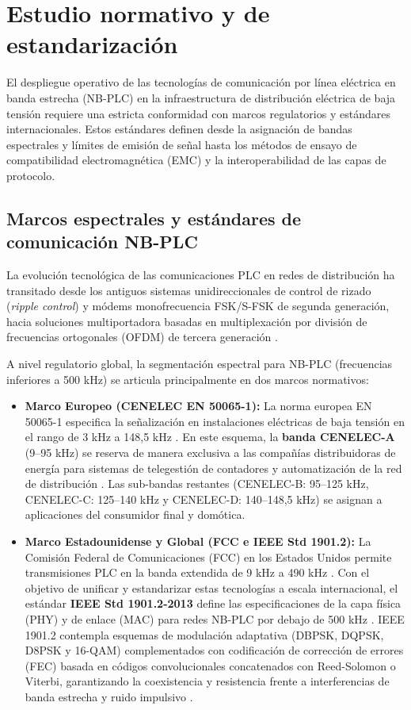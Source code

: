 \section{Estudio normativo y de estandarización}
\label{sec:estudio_normativo}

El despliegue operativo de las tecnologías de comunicación por línea eléctrica en banda estrecha (NB-PLC) en la infraestructura de distribución eléctrica de baja tensión requiere una estricta conformidad con marcos regulatorios y estándares internacionales. Estos estándares definen desde la asignación de bandas espectrales y límites de emisión de señal hasta los métodos de ensayo de compatibilidad electromagnética (EMC) y la interoperabilidad de las capas de protocolo.

\subsection{Marcos espectrales y estándares de comunicación NB-PLC}
\label{subsec:marcos_espectrales}

La evolución tecnológica de las comunicaciones PLC en redes de distribución ha transitado desde los antiguos sistemas unidireccionales de control de rizado (\textit{ripple control}) y módems monofrecuencia FSK/S-FSK de segunda generación, hacia soluciones multiportadora basadas en multiplexación por división de frecuencias ortogonales (OFDM) de tercera generación \cite{5764444}.

A nivel regulatorio global, la segmentación espectral para NB-PLC (frecuencias inferiores a 500 kHz) se articula principalmente en dos marcos normativos:
\begin{itemize}
    \item \textbf{Marco Europeo (CENELEC EN 50065-1):} La norma europea EN 50065-1 especifica la señalización en instalaciones eléctricas de baja tensión en el rango de 3 kHz a 148,5 kHz \cite{EN50065_1}. En este esquema, la \textbf{banda CENELEC-A} (9--95 kHz) se reserva de manera exclusiva a las compañías distribuidoras de energía para sistemas de telegestión de contadores y automatización de la red de distribución \cite{5764444}. Las sub-bandas restantes (CENELEC-B: 95--125 kHz, CENELEC-C: 125--140 kHz y CENELEC-D: 140--148,5 kHz) se asignan a aplicaciones del consumidor final y domótica.
    \item \textbf{Marco Estadounidense y Global (FCC e IEEE Std 1901.2):} La Comisión Federal de Comunicaciones (FCC) en los Estados Unidos permite transmisiones PLC en la banda extendida de 9 kHz a 490 kHz \cite{6679210}. Con el objetivo de unificar y estandarizar estas tecnologías a escala internacional, el estándar \textbf{IEEE Std 1901.2-2013} define las especificaciones de la capa física (PHY) y de enlace (MAC) para redes NB-PLC por debajo de 500 kHz \cite{6679210}. IEEE 1901.2 contempla esquemas de modulación adaptativa (DBPSK, DQPSK, D8PSK y 16-QAM) complementados con codificación de corrección de errores (FEC) basada en códigos convolucionales concatenados con Reed-Solomon o Viterbi, garantizando la coexistencia y resistencia frente a interferencias de banda estrecha y ruido impulsivo \cite{6679210, 7443190}.
\end{itemize}

